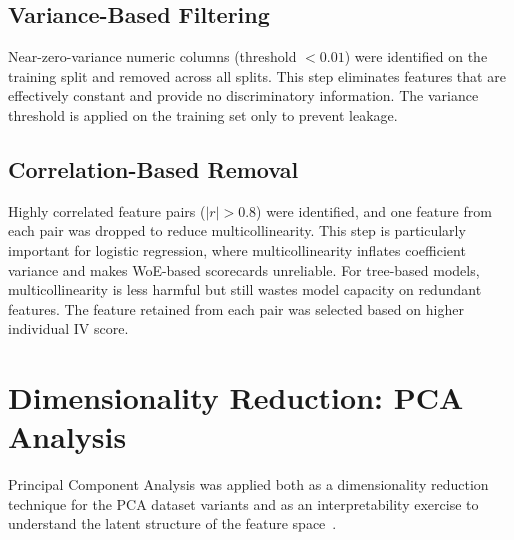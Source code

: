 \subsection{Variance-Based Filtering}

Near-zero-variance numeric columns (threshold $< 0.01$) were identified on the training split and removed across all splits. This step eliminates features that are effectively constant and provide no discriminatory information. The variance threshold is applied on the training set only to prevent leakage.

\subsection{Correlation-Based Removal}

Highly correlated feature pairs ($|r| > 0.8$) were identified, and one feature from each pair was dropped to reduce multicollinearity. This step is particularly important for logistic regression, where multicollinearity inflates coefficient variance and makes WoE-based scorecards unreliable. For tree-based models, multicollinearity is less harmful but still wastes model capacity on redundant features. The feature retained from each pair was selected based on higher individual IV score.



\section{Dimensionality Reduction: PCA Analysis}
\label{sec:pca}

Principal Component Analysis was applied both as a dimensionality reduction technique for the PCA dataset variants and as an interpretability exercise to understand the latent structure of the feature space~\cite{jolliffe2002}.

